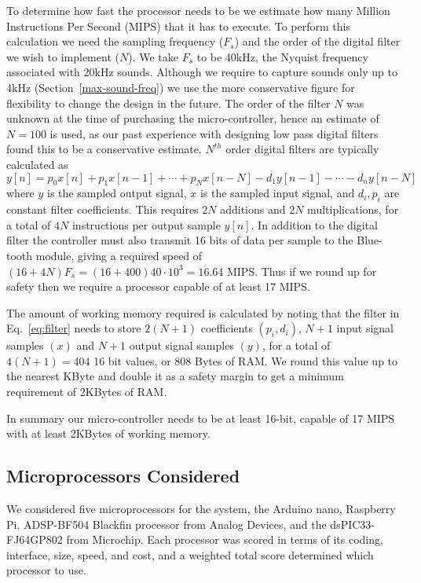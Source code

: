 To determine how fast the processor needs to be we estimate how many Million Instructions Per Second (MIPS) that it has to execute. To perform this calculation we need the sampling frequency ($F_s$) and the order of the digital filter we wish to implement ($N$). We take $F_s$ to be 40kHz, the Nyquist frequency associated with 20kHz sounds. Although we require to capture sounds only up to 4kHz (Section~\ref{max-sound-freq}) we use the more conservative figure for flexibility to change the design in the future. The order of the filter $N$ was unknown at the time of purchasing the micro-controller, hence an estimate of $N=100$ is used, as our past experience with designing low pass digital filters found this to be a conservative estimate. $N^{th}$ order digital filters are typically calculated as~\cite[p.~164]{Mitra2011}
\begin{equation}
y[n] = p_0 x[n] + p_1 x[n-1] + \cdots + p_N x[n-N] - d_1 y[n-1] - \cdots - d_n y[n-N]
\label{eq:filter}
\end{equation}
where $y$ is the sampled output signal, $x$ is the sampled input signal, and $d_i, p_i$ are constant filter coefficients. This requires $2N$ additions and $2N$ multiplications, for a total of $4N$ instructions per output sample $y[n]$. In addition to the digital filter the controller must also transmit 16 bits of data per sample to the Blue-tooth module, giving a required speed of $(16+4N)F_s=(16+400)40\cdot10^3=16.64$ MIPS. Thus if we round up for safety then we require a processor capable of at least 17 MIPS.

The amount of working memory required is calculated by noting that the filter in Eq.~\ref{eq:filter} needs to store $2(N+1)$ coefficients $(p_i, d_i)$, $N+1$ input signal samples $(x)$ and $N+1$ output signal samples $(y)$, for a total of $4(N+1)=404$ 16 bit values, or 808 Bytes of RAM. We round this value up to the nearest KByte and double it as a safety margin to get a minimum requirement of 2KBytes of RAM.

In summary our micro-controller needs to be at least 16-bit, capable of 17 MIPS with at least 2KBytes of working memory.

\subsection{Microprocessors Considered}
We considered five microprocessors for the system, the Arduino nano, Raspberry Pi, ADSP-BF504 Blackfin processor from Analog Devices, and the dsPIC33-FJ64GP802 from Microchip. Each processor was scored in terms of its coding, interface, size, speed, and cost, and a weighted total score determined which processor to use. 

